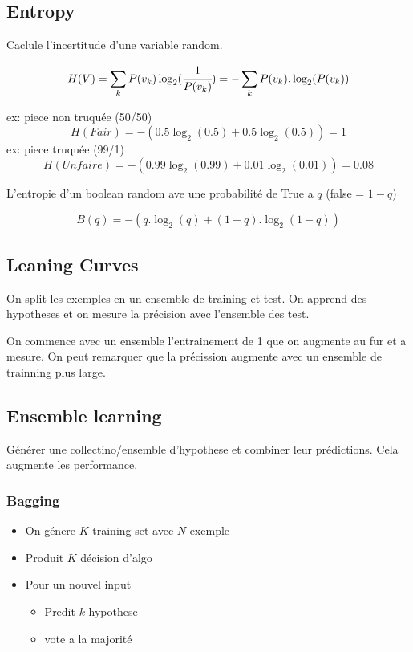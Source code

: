 \documentclass[12pt]{article}
\begin{document}
	\subsection{Entropy}
		Caclule l'incertitude d'une variable random.
		
		\begin{equation}
			H(V) = \sum_{k}P(v_k)\log_2(\cfrac{1}{P(v_k)}) = -\sum_{k}P(v_k).\log_2(P(v_k))
		\end{equation}
		
		ex: piece non truquée (50/50)
		\begin{equation}
			H(Fair) = -(0.5\log_2(0.5) + 0.5\log_2(0.5)) = 1
		\end{equation}
		ex: piece truquée (99/1)
		\begin{equation} 
			H(Unfaire) = -(0.99\log_2(0.99) + 0.01\log_2(0.01)) = 0.08
		\end{equation}
		
		L'entropie d'un boolean random ave une probabilité de True a $q$ (false = $1-q$)
		
		\begin{equation}
			B(q) = -(q.\log_2(q) + (1-q).\log_2(1-q))
		\end{equation}
		
	\subsection{Leaning Curves}
		On split les exemples en un ensemble de training et test. On apprend des hypotheses et on mesure la précision avec l'ensemble des test.
		
		On commence avec un ensemble l'entrainement de 1 que on augmente au fur et a mesure. On peut remarquer que la précission augmente avec un ensemble de trainning plus large. 
		
	\subsection{Ensemble learning}
	
		Générer une collectino/ensemble d'hypothese et combiner leur prédictions. Cela augmente les performance.
		\subsubsection{Bagging}
			\begin{itemize}
				\item On génere $K$ training set avec $N$ exemple
				\item Produit $K$ décision d'algo
				\item Pour un nouvel input
				\begin{itemize}
					\item Predit $k$ hypothese
					\item vote a la majorité
				\end{itemize}
			\end{itemize}
			
\end{document}
